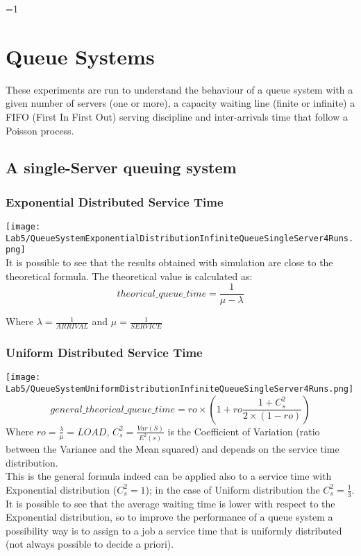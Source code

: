 \documentclass[twocolumn,letterpaper]{report}
\newcounter{debug}
\begin{document}
\twocolumn
\ifnum\value{debug}=1 {
    
\chapter{Queue Systems}
	These experiments are run to understand the behaviour of a queue system with a given number of servers (one or more), a capacity waiting line (finite or infinite) a FIFO (First In First Out) serving discipline and inter-arrivals time that follow a Poisson process.
	
	 \section{A single-Server queuing system}
	 			\subsection{Exponential Distributed Service Time}
	 						\texttt{[image: Lab5/QueueSystemExponentialDistributionInfiniteQueueSingleServer4Runs.png]} \\
								It is possible to see that the results obtained with simulation are close to the theoretical formula. 
			The theoretical value is calculated as:
			\begin{equation}
				theorical\_queue\_time = \frac{1}{ \mu - \lambda} 
			\end{equation}
			\begin{center}
				Where $\lambda=\frac{1}{ARRIVAL}$ and $\mu=\frac{1}{SERVICE}$
			\end{center}
			
	 			\subsection{Uniform Distributed Service Time}
	 			\texttt{[image: Lab5/QueueSystemUniformDistributionInfiniteQueueSingleServer4Runs.png]} \\
	 			\begin{equation}
						general\_theorical\_queue\_time = ro \times ( 1 + ro \frac{1+C_s^2}{2\times(1-ro)} )
				\end{equation}
						Where $ro=\frac{\lambda}{\mu}=LOAD$, $C_s^2=\frac{Var(S)}{E^2(s)}$ is the Coefficient of Variation (ratio between the Variance and the Mean squared) and depends on the service time distribution. \\
						This is the general formula indeed can be applied also to a service time with Exponential distribution ($C_s^2=1$); in the case of Uniform distribution the $C_s^2=\frac{1}{3}$. \\
						It is possible to see that the average waiting time is lower with respect to the Exponential distribution, so to improve the performance of a queue system a possibility way is to assign to a job a service time that is uniformly distributed (not always possible to decide a priori).
						
}
\end{document}
